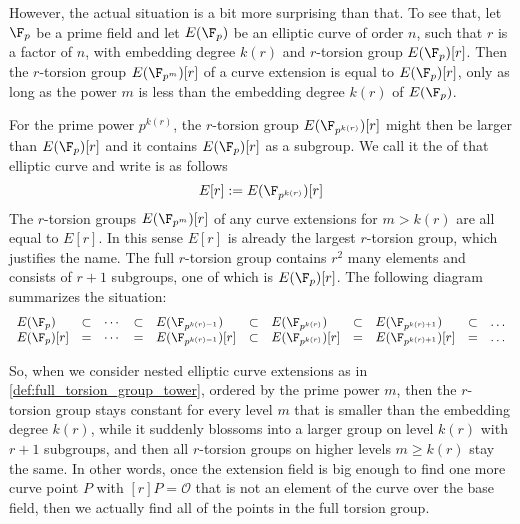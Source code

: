 However, the actual situation is a bit more surprising than that. To see that, let $\F_p$ be a prime field and let $E(\F_p)$ be an elliptic curve of order $n$, such that $r$ is a factor of $n$, with embedding degree $k(r)$ and $r$-torsion group $E(\F_p)[r]$. Then the $r$-torsion group $E(\F_{p^m})[r]$ of a curve extension is equal to $E(\F_p)[r]$, only as long as the power $m$ is less than the embedding degree $k(r)$ of $E(\F_p)$. 

For the prime power $p^{k(r)}$, the $r$-torsion group $E(\F_{p^{k(r)}})[r]$ might then be larger than $E(\F_p)[r]$ and it contains $E(\F_p)[r]$ as a subgroup. We call it the  of that elliptic curve and write is as follows
\begin{equation}
\label{def:full_torsion_group}
E[r] := E(\F_{p^{k(r)}})[r]
\end{equation}
The $r$-torsion groups $E(\F_{p^m})[r]$ of any curve extensions for $m>k(r)$ are all equal to $E[r]$. In this sense $E[r]$ is already the largest $r$-torsion group, which justifies the name. The full $r$-torsion group contains $r^2$ many elements and consists of $r+1$ subgroups, one of which is $E(\F_{p})[r]$. The following diagram summarizes the situation:
\begin{equation}
\label{def:full_torsion_group_tower}
\begin{array}{lccclclclcl}
E(\F_{p}) & \subset & \cdots  & \subset & E(\F_{p^{k(r)-1}}) & \subset & E(\F_{p^{k(r)}}) & \subset & E(\F_{p^{k(r)+1}}) & \subset & \ldots\\
E(\F_{p})[r] & = & \cdots  & = & E(\F_{p^{k(r)-1}})[r] & \subset & E(\F_{p^{k(r)}})[r] & = & 
E(\F_{p^{k(r)+1}})[r] & = & \ldots
\end{array}
\end{equation}

So, when we consider nested elliptic curve extensions as in \ref{def:full_torsion_group_tower}, ordered by the prime power $m$, then the $r$-torsion group stays constant for every level $m$ that is smaller than the embedding degree $k(r)$, while it suddenly blossoms into a larger group on level $k(r)$ with $r+1$ subgroups, and then all $r$-torsion groups on higher levels $m\geq k(r)$ stay the same. In other words, once the extension field is big enough to find one more curve point $P$ with $[r]P=\mathcal{O}$ that is not an element of the curve over the base field, then we actually find all of the points in the full torsion group.

